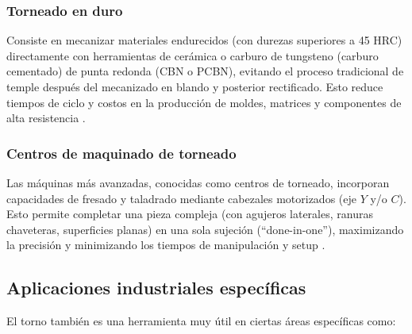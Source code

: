\documentclass[12pt,a4paper]{article}
\begin{document}
\subsubsection{Torneado en duro}
Consiste en mecanizar materiales endurecidos (con durezas superiores a 45 HRC) directamente con herramientas de cerámica o carburo de tungsteno (carburo cementado) de punta redonda (CBN o PCBN), evitando el proceso tradicional de temple después del mecanizado en blando y posterior rectificado. Esto reduce tiempos de ciclo y costos en la producción de moldes, matrices y componentes de alta resistencia \cite{redeweb2021, quintero2018}.

\subsubsection{Centros de maquinado de torneado}
Las máquinas más avanzadas, conocidas como centros de torneado, incorporan capacidades de fresado y taladrado mediante cabezales motorizados (eje $Y$ y/o $C$). Esto permite completar una pieza compleja (con agujeros laterales, ranuras chaveteras, superficies planas) en una sola sujeción (``done-in-one''), maximizando la precisión y minimizando los tiempos de manipulación y setup \cite{torno_protocolo, degarmo2011}.

\subsection{Aplicaciones industriales específicas}
\label{subsec:aplicaciones_industriales}

El torno también es una herramienta muy útil en ciertas áreas específicas como:
\end{document}
